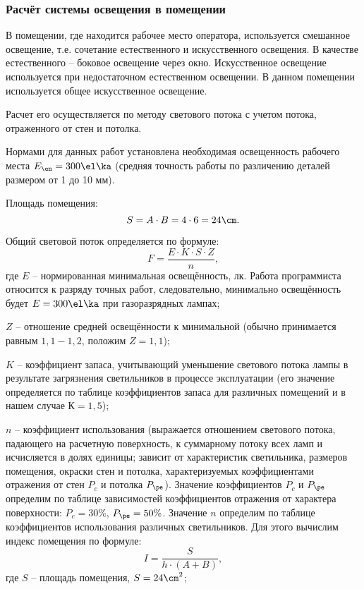 \subsubsection{Расчёт системы освещения в помещении}

В помещении, где находится рабочее место оператора, используется смешанное освещение, т.е. сочетание естественного и искусственного освещения. В качестве естественного -- боковое освещение через окно. Искусственное освещение используется при недостаточном естественном освещении. В данном помещении используется общее искусственное освещение.

Расчет его осуществляется по методу светового потока с учетом потока, отраженного от стен и потолка.

Нормами для данных работ установлена необходимая освещенность рабочего места $E_{\en}=300\el\ka$ (средняя точность работы по различению деталей размером от 1 до 10 мм). 

Площадь помещения:
\begin{equation*}
	S = A \cdot B = 4 \cdot 6 = 24 \cm.
\end{equation*}

Общий световой поток определяется по формуле:
\begin{equation*}
	F = \frac{E \cdot K \cdot S \cdot Z}{n},
\end{equation*}
где $E$ -- нормированная минимальная освещённость, лк. Работа программиста относится к разряду точных работ, следовательно, минимально освещённость будет $E = 300 \el\ka$ при газоразрядных лампах;

$Z$ -- отношение средней освещённости к минимальной (обычно принимается равным $1,1-1,2$, положим $Z = 1,1$);

$K$ -- коэффициент запаса, учитывающий уменьшение светового потока лампы в результате загрязнения светильников в процессе эксплуатации (его значение определяется по таблице коэффициентов запаса для различных помещений и в нашем случае $К = 1,5$);

$n$ -- коэффициент использования (выражается отношением светового потока, падающего на расчетную поверхность, к суммарному потоку всех ламп и исчисляется в долях единицы; зависит от характеристик светильника, размеров помещения, окраски стен и потолка, характеризуемых коэффициентами отражения от стен $P_c$ и потолка $P_{\pe}$). Значение коэффициентов $P_c$ и $P_{\pe}$ определим по таблице зависимостей коэффициентов отражения от характера поверхности: $P_c=30\%$, $P_{\pe}=50\%$. Значение $n$ определим по таблице коэффициентов использования различных светильников. Для этого вычислим индекс помещения по формуле:
\begin{equation*}
	I = \frac{S}{h \cdot (A + B)},
\end{equation*}
где $S$ -- площадь помещения, $S = 24 \cm^2$;

